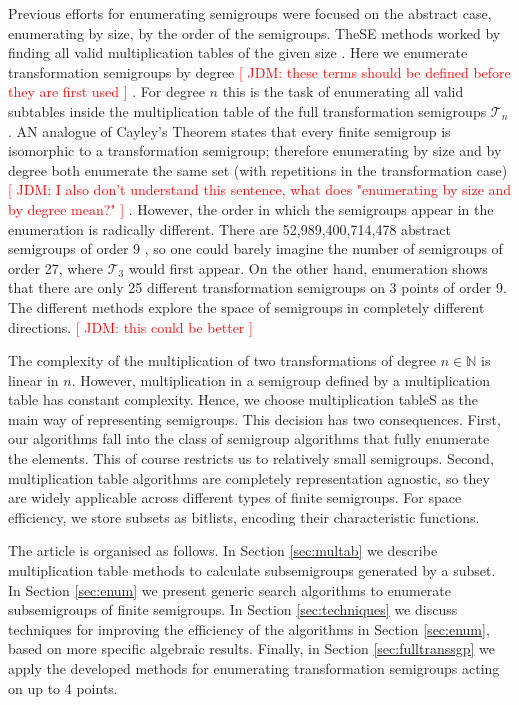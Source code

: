 \documentclass{amsart}
\newcommand{\cT}{{\mathcal T}}
\newcommand{\todo}[1]{\textcolor{red}{ \small \textsf{[ #1 ]} \normalsize}}
\theoremstyle{plain}
\theoremstyle{definition}
\begin{document}
Previous efforts for enumerating semigroups were focused on the abstract case, enumerating by size, by the order of the semigroups.
TheSE methods worked by finding all valid multiplication tables of the given size \cite{monoidenum2009,For55,JW77,KRS76,Ple67,SZT94,tamura2,tamura1}.
Here we enumerate transformation semigroups by degree\todo{JDM: these terms
should be defined before they are first used}.
For degree $n$ this is the task of enumerating all valid subtables inside the
multiplication table of the full transformation semigroups $\cT_n$.  AN analogue of Cayley's Theorem states that every finite semigroup is isomorphic to
a transformation semigroup; therefore enumerating by size and by degree both
enumerate the same set (with repetitions in the transformation
case)\todo{JDM: I also don't understand this sentence, what does
"enumerating by size and by degree mean?"}.
 However,
the order in which the semigroups appear in the enumeration is radically
different.  There are 52,989,400,714,478 abstract semigroups of order 9
\cite{monoidenum2009}, so one could barely imagine the number of semigroups of
order 27, where $\cT_3$ would first appear.  On the other hand, enumeration shows that there are only
25 different transformation semigroups on 3 points of order 9.  The
different methods explore the space of semigroups in completely different
directions.\todo{JDM: this could be better}

The complexity of the multiplication of two transformations of degree $n\in\mathbb{N}$ is linear in $n$.
However, multiplication in a semigroup defined by a multiplication table has constant complexity.
Hence, we choose multiplication tableS as the main way of representing semigroups.
This decision has two consequences. 
First, our algorithms fall into the class of semigroup algorithms that fully enumerate the elements.
This of course  restricts us to relatively small semigroups.%
Second, multiplication table algorithms are completely representation agnostic,
so they are widely applicable across different types of finite semigroups.
For space efficiency, we store subsets as bitlists, encoding their characteristic functions.

The article is organised as follows.
In Section \ref{sec:multab} we describe multiplication table methods to calculate subsemigroups generated by a subset.
In Section \ref{sec:enum} we present generic search algorithms to enumerate subsemigroups of
finite semigroups.
In Section \ref{sec:techniques} we discuss techniques for improving the
efficiency of the algorithms in Section \ref{sec:enum}, based on more specific algebraic results.
Finally, in Section \ref{sec:fulltranssgp} we apply the developed methods for enumerating transformation semigroups acting on up to 4 points.
\end{document}
